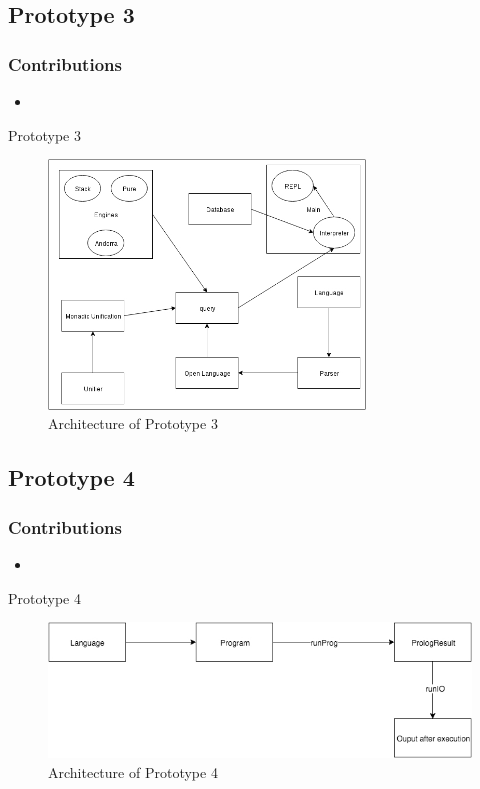 \documentclass[hideothersubsections, t, aspectratio=1610]{beamer}
\begin{document}
\subsection{Prototype 3}

\begin{frame}
\frametitle{Contributions}
\begin{itemize}
\item
\end{itemize}
\end{frame}

\begin{frame}{Prototype 3}
\begin{figure}[H]
  \includegraphics[width=0.75\textwidth]{Prototype-3-architecture.jpeg}
  \caption{Architecture of Prototype 3}
  \label{fig:proto1-arch}
\end{figure}
\end{frame}


\subsection{Prototype 4}

\begin{frame}
\frametitle{Contributions}
\begin{itemize}
\item
\end{itemize}
\end{frame}


\begin{frame}{Prototype 4}
\begin{figure}[H]
  \includegraphics[width=1\textwidth]{Prototype-4-architecture.jpeg}
  \caption{Architecture of Prototype 4}
  \label{fig:proto1-arch}
\end{figure}
\end{frame}
\end{document}
